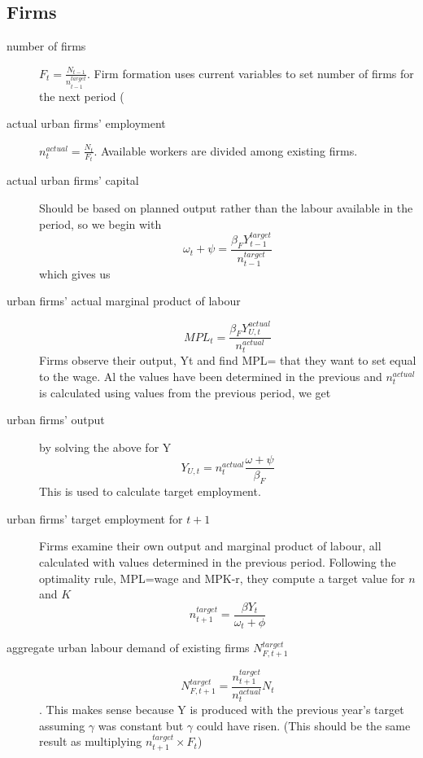 \subsection{Firms}
\begin{description}
\item[number of firms] $F_{t}=\frac{N_{t-1}}{n^{target}_{t-1}}$. Firm formation uses current variables to set number of firms for the next period 
(\color{red}
\item[actual urban firms' employment] 
$n_t^{actual}= \frac{N_t}{F_t} $. Available workers are divided among existing firms.   

\item[actual urban firms' capital] Should be based on planned output rather than the labour available in the period, so we begin with \[\omega_{t}+\psi = \frac{\beta_{F}Y^{target}_{t-1}}{n_{t-1}^{target}}\]
which gives us 


\item[urban firms' actual marginal product of labour]
\[MPL_{t} = \frac{\beta_{F}Y^{actual}_{U,t}}{n_t^{actual}}\] \noindent Firms observe their output, Yt and find  MPL= that they want to set equal to the wage. Al the values have been determined in the previous  and $n^{actual}_t$ is calculated using values from the  previous period, we get

\item[urban firms' output] by solving the above for Y
\[Y_{U,t}=  n_t^{actual}\frac{\omega+\psi}{\beta_{F}} \] 
This is used to calculate target employment.

\item[urban firms' target employment for $t+1$] Firms examine their own output and marginal product of labour, all calculated with values determined in the previous period. Following the  optimality rule, MPL=wage and MPK-r, they compute a target value for $n$ and $K$
\[ n^{target}_{t+1}= \frac{\beta Y_{t}}{\omega_t + \phi} \]



\item[aggregate urban labour demand of existing firms $N_{F,t+1}^{target}$] 

\[N_{F,t+1}^{target} = \frac{n^{target}_{t+1}}{n^{actual}_{t}} N_t\].   
This makes sense because Y is produced with the previous year's target assuming  $\gamma$ was constant but  $\gamma$ could have risen. (This should be the same result as  multiplying $n^{target}_{t+1} \times F_{t} $)




\end{description}
